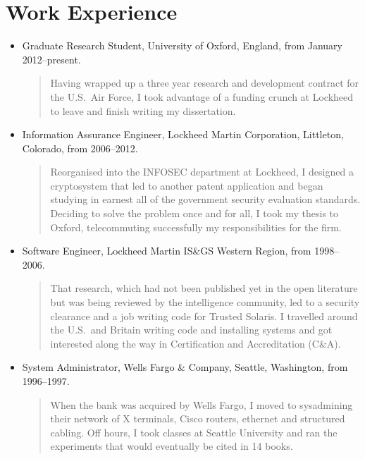 \documentclass[letterpaper]{article}
\begin{document}
\section*{Work Experience} %

\begin{itemize}
	\item Graduate Research Student, University of Oxford, England, from January 2012--present.

		\begin{quote}\vspace{-2mm}
			Having wrapped up a three year research and development contract for the U.S.\ Air
			Force, I took advantage of a funding crunch at Lockheed to leave and finish writing
			my dissertation.
		\end{quote}

	\item Information Assurance Engineer, Lockheed Martin Corporation, Littleton, Colorado, from
		2006--2012.

		\begin{quote}\vspace{-2mm}
			Reorganised into the INFOSEC department at Lockheed, I designed a cryptosystem that
			led to another patent application and began studying in earnest all of the government
			security evaluation standards.  Deciding to solve the problem once and for all, I
			took my thesis to Oxford, telecommuting successfully my responsibilities for the firm.
		\end{quote}

	\item Software Engineer, Lockheed Martin IS\&GS Western Region, from 1998--2006.

		\begin{quote}\vspace{-2mm}
			That research, which had not been published yet in the open literature but was being
			reviewed by the intelligence community, led to a security clearance and a job writing
			code for Trusted Solaris.  I travelled around the U.S.\ and Britain writing code and
			installing systems and got interested along the way in Certification and
			Accreditation (C\&A).
		\end{quote}

	\item System Administrator, Wells Fargo \& Company, Seattle, Washington, from  1996--1997.

		\begin{quote}\vspace{-2mm}
			When the bank was acquired by Wells Fargo, I moved to sysadmining their network of X
			terminals, Cisco routers, ethernet and structured cabling.  Off hours, I took classes
			at Seattle University and ran the experiments that would eventually be cited in 14
			books.
		\end{quote}


\end{itemize}
\end{document}
